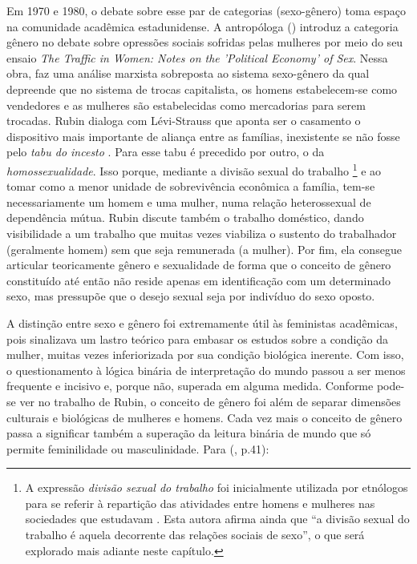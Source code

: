 Em 1970 e 1980, o debate sobre esse par de categorias (sexo-gênero) toma espaço na comunidade acadêmica estadunidense. A antropóloga  (\citeyear{RUBIN1975})  introduz a categoria gênero no debate sobre opressões sociais sofridas pelas mulheres por meio do seu ensaio \emph{The Traffic in Women: Notes on the 'Political Economy' of Sex}. Nessa obra,  faz uma análise marxista sobreposta ao sistema sexo-gênero da qual depreende que no sistema de trocas capitalista, os homens estabelecem-se como vendedores e as mulheres são estabelecidas como mercadorias para serem trocadas.
Rubin dialoga com Lévi-Strauss que aponta ser o casamento o dispositivo mais importante de aliança entre as famílias, inexistente se não fosse pelo \emph{tabu do incesto} \cite{STRAUSS2010}. Para  esse tabu é precedido por outro, o da \emph{homossexualidade}. Isso porque, mediante a divisão sexual do trabalho
\footnote{A expressão \emph{divisão sexual do trabalho} foi inicialmente utilizada por etnólogos para se referir à repartição das atividades entre homens e mulheres nas sociedades que estudavam \cite{KERGOAT2004}. Esta autora afirma ainda que ``a divisão sexual do trabalho é aquela decorrente das relações sociais de sexo'', o que será explorado mais adiante neste capítulo.} e ao tomar como a menor unidade de sobrevivência econômica a família, tem-se necessariamente um homem e uma mulher, numa relação heterossexual de dependência mútua. Rubin discute também o trabalho doméstico, dando visibilidade a um trabalho que muitas vezes viabiliza o sustento do trabalhador (geralmente homem) sem que seja remunerada (a mulher). Por fim, ela consegue articular teoricamente gênero e sexualidade de forma que o conceito de gênero constituído até então não reside apenas em identificação com um determinado sexo, mas pressupõe que o desejo sexual seja por indivíduo do sexo oposto. 

A distinção entre sexo e gênero foi extremamente útil às feministas acadêmicas, pois sinalizava um lastro teórico para embasar os estudos sobre a condição da mulher, muitas vezes inferiorizada por sua condição biológica inerente. Com isso, o questionamento à lógica binária de interpretação do mundo passou a ser menos frequente e incisivo \cite[p.218]{HARAWAY2004} e, porque não, superada em alguma medida. Conforme pode-se ver no trabalho de Rubin, o conceito de gênero foi além de separar dimensões culturais e biológicas de mulheres e homens. Cada vez mais o conceito de gênero passa a significar também a superação da leitura binária de mundo que só permite feminilidade ou masculinidade. Para  (\citeyear{HEILBORN1992}, p.41):

